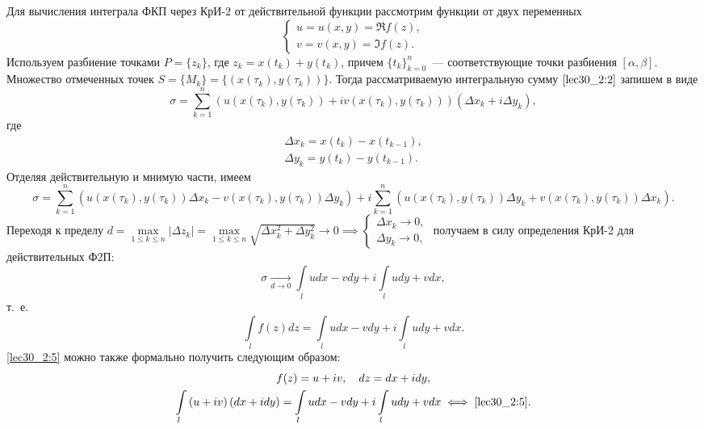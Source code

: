 \documentclass[../../main.tex]{subfiles}
\begin{document}
Для вычисления интеграла ФКП через КрИ-2 от действительной функции 
рассмотрим функции от двух переменных
\begin{equation*}
 \begin{cases}
  u = u\left(x, y\right) = \Re f(z),\\
  v = v\left(x, y\right) = \Im f(z).
 \end{cases}
\end{equation*}
Используем разбиение точками $P = \{z_k\}$, где $z_k = x(t_k) + y(t_k)$, 
причем $\{t_k\}_{k=0}^n $~--- соответствующие точки разбиения 
$\left[\alpha,\beta\right]$. Множество отмеченных точек
$S = \{M_k\} = \{(x(\tau_k), y(\tau_k))\}$. Тогда рассматриваемую интегральную сумму 
$\eqref{lec30_2:2}$ запишем в виде
\[\sigma = \sum\limits_{k=1}^n{\left(u(x(\tau_k), y(\tau_k))
+ iv(x(\tau_k), y(\tau_k))\right)\left(\Delta x_k + 
i\Delta y_k\right)},\] 
где
\begin{gather*}
\Delta x_k = x(t_k) - x(t_{k-1}),\\
\Delta y_k = y(t_k) - y(t_{k-1}).
\end{gather*}
Отделяя действительную и мнимую части, имеем
\[
\sigma = \sum_{k=1}^n{(u(x(\tau_k), y(\tau_k))\Delta x_k -
v(x(\tau_k), y(\tau_k))\Delta y_k)} + 
i\sum_{k=1}^n{(u(x(\tau_k), y(\tau_k))\Delta y_k + 
v(x(\tau_k), y(\tau_k))\Delta x_k)}.
\]
Переходя к пределу 
$d = \underset{1 \leq k \leq n}{\max}|\Delta z_k| = 
\underset{1 \leq k \leq n}{\max}\sqrt{\Delta x_k^2 + \Delta y_k^2}
\longrightarrow 0 \implies
\begin{cases}
    \Delta x_k \longrightarrow 0,\\
    \Delta y_k \longrightarrow 0,
\end{cases}$ \hspace{-1em}
получаем в силу определения КрИ-2 для действительных Ф2П:
\[
\sigma \underset{d \to 0}{\longrightarrow} \int\limits_l{
udx - vdy} + i\int\limits_l{udy + vdx},
\]
т.~е.
\begin{equation}
    \label{lec30_2:5}    
    \int\limits_{l}{f(z)dz} = \int\limits_l{udx - vdy} + 
    i\int\limits_l{udy + vdx}.
\end{equation}
\eqref{lec30_2:5} можно также формально получить следующим образом:
\begin{gather*}
f(z) = u + iv, \quad
dz = dx + idy, \\
\int\limits_l{\left(u+iv\right)\left(dx + idy\right)} = 
\int\limits_l{udx - vdy} + i\int\limits_l{udy + vdx} 
\iff \eqref{lec30_2:5}.
\end{gather*}
\end{document}
